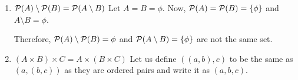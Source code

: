 \begin{enumerate}
\begin{proof}
		      Thus, by definition of intersection, $x \in A \cap B$.
		      Therefore, $X \subseteq A \cap B$. Hence, proved.
	      \end{proof}


	      Now, let $X \in \mc{P}(A) \cap \mc{P}(B)$ be an abitrary element. Then we have
	      \begin{align}
		      X \in \mc{P}(A) \cap \mc{P}(B)                                                             \\
		      X \in \mc{P}(A) \text{ and } X \in \mc{P}(B) &  & \quad \text{(Definition \ref{powerset})} \\
		      X \subseteq A \text{ and } X \subseteq B     &  & \quad \text{(Lemma \ref{intersub})}      \\
		      X \subseteq A \cap B                                                                       \\
		      X \in \mc{P}(A \cap B)
	      \end{align}

	      Thus, proved that $\mc{P}(A) \cap \mc{P}(B) \subseteq \mc{P}(A \cap B)$.

	      Now, let $X \in \mc{P}(A \cap B)$ be an abitrary element. Then by Definition \ref{powerset}, we have
	      $$X \in \mc{P}(A \cap B) \implies X \subseteq A \cap B$$

	      Since $A \cap B \subseteq A$ and $A \cap B \subseteq B$, we have,

	      \begin{align}
		      X \subseteq A \text{ and } X \subseteq B     \\
		      X \in \mc{P}(A) \text{ and } X \in \mc{P}(B) \\
		      X \in \mc{P}(A) \cap \mc{P}(B)
	      \end{align}

	      Thus, proved that $\mc{P}(A \cap B) \subseteq \mc{P}(A) \cap \mc{P}(B)$.

	      Hence, proved.
	      \es

	\item $\mathcal{P}(A) \setminus \mathcal{P}(B) = \mathcal{P}(A \setminus B)$
	      \bs
	      Let $A = B = \phi$. Now, $\mathcal{P}(A) = \mathcal{P}(B) = \{\phi\}$ and $A \setminus B = \phi$.

	      Therefore, $\mathcal{P}(A) \setminus \mathcal{P}(B) = \phi$ and $\mathcal{P}(A \setminus B) = \{\phi\}$ are not the same set.
	      \es

	\item $(A \times B) \times C = A \times (B \times C)$
	      \bs
	      Let us define $((a, b), c)$ to be the same as $(a, (b, c))$ as they are ordered pairs and write it as $(a, b, c)$.


\end{enumerate}
